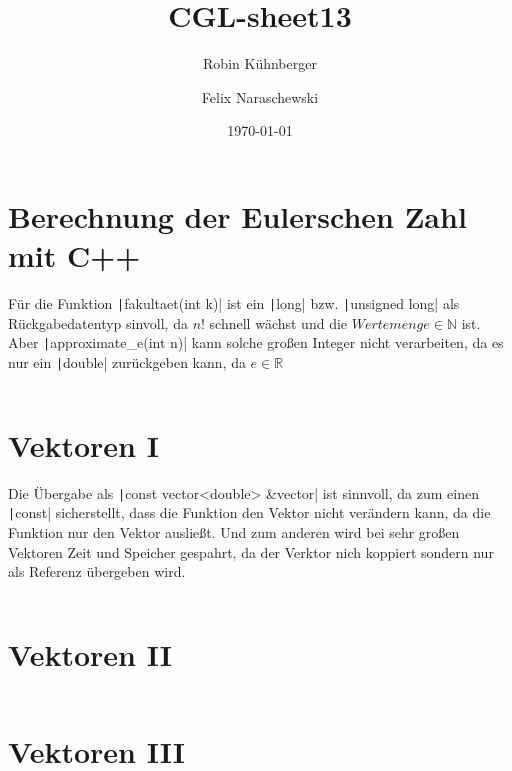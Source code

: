 \documentclass{scrartcl}
\title{CGL-sheet13}
\author[1]{Robin Kühnberger}
\author[2]{Felix Naraschewski}
\affil[1]{University Stuttgart}
\affil[2]{University Stuttgart}
\date{\today}
\begin{document}
\maketitle
\tableofcontents

\section{Berechnung der Eulerschen Zahl mit C++}

Für die Funktion \texttt|fakultaet(int k)| ist ein \texttt|long| bzw. \texttt|unsigned long| als Rückgabedatentyp sinvoll, da $n!$ schnell wächst und die $Wertemenge \in \mathbb{N}$ ist. Aber \texttt|approximate_e(int n)| kann solche großen Integer nicht verarbeiten, da es nur ein \texttt|double| zurückgeben kann, da $e \in \mathbb{R}$

\inputminted[breaklines, linenos, bgcolor=gray!10]{cpp}{e-approx.cpp}

\section{Vektoren I}

Die Übergabe als \texttt|const vector<double> &vector| ist sinnvoll, da zum einen \texttt|const| sicherstellt, dass die Funktion den Vektor nicht verändern kann, da die Funktion nur den Vektor ausließt. Und zum anderen wird bei sehr großen Vektoren Zeit und Speicher gespahrt, da der Verktor nich koppiert sondern nur als Referenz übergeben wird.

\inputminted[breaklines, linenos, bgcolor=gray!10]{cpp}{vektoren-i.cpp}

\section{Vektoren II}
\inputminted[breaklines, linenos, bgcolor=gray!10]{cpp}{vektoren-ii.cpp}

\section{Vektoren III}
\inputminted[breaklines, linenos, bgcolor=gray!10]{cpp}{vektoren-iii.cpp}


%
%

\end{document}
